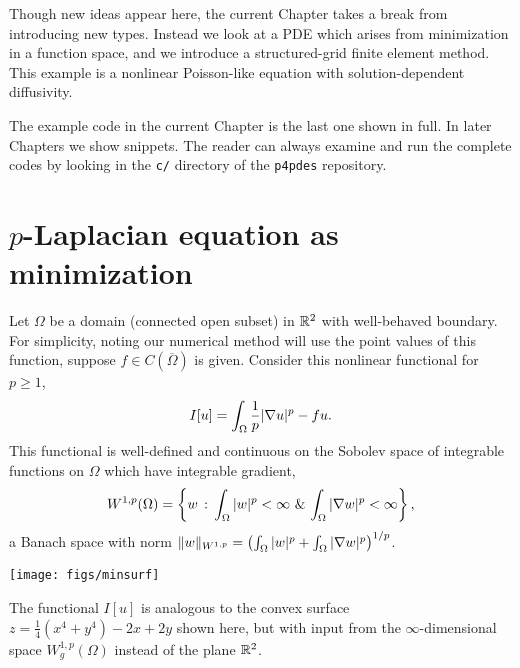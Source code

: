 Though new ideas appear here, the current Chapter takes a break from introducing new \PETSc types.  Instead we look at a PDE which arises from minimization in a function space, and we introduce a structured-grid finite element method.  This example is a nonlinear Poisson-like equation with solution-dependent diffusivity.

The example code in the current Chapter is the last one shown in full.  In later Chapters we show snippets.  The reader can always examine and run the complete codes by looking in the \texttt{c/} directory of the \texttt{p4pdes} repository.


\section{$p$-Laplacian equation as minimization}

Let $\Omega$ be a domain (connected open subset) in $\mathbb{R}^2$ with well-behaved boundary.  For simplicity, noting our numerical method will use the point values of this function, suppose $f\in C(\overline \Omega)$ is given.  Consider this nonlinear functional for $p \ge 1$,
\begin{equation}
    I[u] = \int_\Omega \frac{1}{p} |\nabla u|^p - fu.  \label{eq:of:functional}
\end{equation}
This functional is well-defined and continuous on the Sobolev space \citep{AdamsFournier2003,Evans2010} of integrable functions on $\Omega$ which have integrable gradient,
\begin{equation}
    W^{1,p}(\Omega) = \left\{w \,:\, \int_\Omega |w|^p < \infty \,\, \& \, \int_\Omega |\nabla w|^p < \infty\right\}, \label{eq:of:sobolevdefn}
\end{equation}
a Banach space with norm $\|w\|_{W^{1,p}} = \left(\int_\Omega |w|^p + \int_\Omega |\nabla w|^p\right)^{1/p}$.

\begin{marginfigure}
\texttt{[image: figs/minsurf]} %
\medskip
\caption{The functional $I[u]$ is analogous to the convex surface $z = \tfrac{1}{4}(x^4 + y^4) - 2x + 2y$ shown here, but with input from the $\infty$-dimensional space $W_g^{1,p}(\Omega)$ instead of the plane $\mathbb{R}^2$.}
\label{fig:of:cartoonfunctional}
\end{marginfigure}

